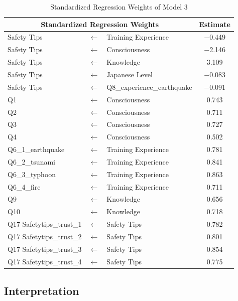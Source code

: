 \begin{table}[h]
\caption{Standardized Regression Weights of Model 3 }
\label{table22}
\centering
\begin{tabular}{|l|c|l|c|}
\hline
\multicolumn{3}{|c|}{Standardized Regression Weights} & Estimate \\
\hline
Safety Tips & $\longleftarrow$ & Training Experience & $-$0.449 \\
Safety Tips & $\longleftarrow$ & Consciousness & $-$2.146 \\
Safety Tips & $\longleftarrow$ & Knowledge & 3.109 \\
Safety Tips & $\longleftarrow$ & Japanese Level & $-$0.083\\
Safety Tips & $\longleftarrow$ & Q8\_experience\_earthquake & $-$0.091 \\
Q1 & $\longleftarrow$ & Consciousness & 0.743 \\
Q2 & $\longleftarrow$ & Consciousness & 0.711 \\
Q3 & $\longleftarrow$ & Consciousness & 0.727 \\
Q4 & $\longleftarrow$ & Consciousness & 0.502 \\
Q6\_1\_earthquake & $\longleftarrow$ & Training Experience & 0.781 \\
Q6\_2\_tsunami & $\longleftarrow$ & Training Experience & 0.841 \\
Q6\_3\_typhoon & $\longleftarrow$ & Training Experience & 0.863 \\
Q6\_4\_fire & $\longleftarrow$ & Training Experience & 0.711 \\
Q9 & $\longleftarrow$ & Knowledge & 0.656 \\
Q10 & $\longleftarrow$ & Knowledge & 0.718 \\
Q17 Safetytips\_trust\_1 & $\longleftarrow$ & Safety Tips & 0.782 \\
Q17 Safetytips\_trust\_2 & $\longleftarrow$ & Safety Tips & 0.801 \\
Q17 Safetytips\_trust\_3 & $\longleftarrow$ & Safety Tips & 0.854 \\
Q17 Safetytips\_trust\_4 & $\longleftarrow$ & Safety Tips & 0.775 \\
\hline
\end{tabular}
\end{table}
\fi




\subsection{Interpretation}

